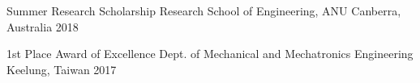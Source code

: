 


\begin{cvhonors}

  \cvhonor
    {Summer Research Scholarship} %
    {Research School of Engineering, ANU} %
    {Canberra, Australia} %
    {2018} %

  \cvhonor
    {1st Place Award of Excellence} %
    {Dept. of Mechanical and Mechatronics Engineering} %
    {Keelung, Taiwan} %
    {2017} %

\end{cvhonors}
